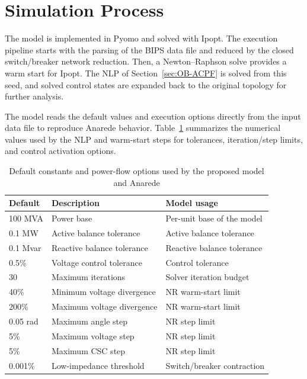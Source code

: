 \documentclass[letterpaper,journal]{IEEEtran}
\begin{document}
\section{Simulation Process}

The model is implemented in Pyomo and solved with Ipopt. The execution pipeline starts with the parsing of the BIPS data file and reduced
by the closed switch/breaker network reduction. Then, a Newton--Raphson solve provides a warm start for Ipopt. The NLP of 
Section~\ref{sec:OB-ACPF} is solved from this seed, and solved control states are expanded back to the original
topology for further analysis.

The model reads the default values and execution options directly from the input data file to reproduce Anarede behavior.
Table~\ref{tab:anarede_defaults} summarizes the numerical values used by the NLP and warm-start steps for tolerances,
iteration/step limits, and control activation options.

\begin{table}[htb]
	\centering
	\footnotesize
	\caption{Default constants and power-flow options used by the proposed model and Anarede}
	\label{tab:anarede_defaults}
	\renewcommand{\arraystretch}{1.2}
	\setlength{\tabcolsep}{2pt}
	\begin{tabular}{lll}
		\hline
		\textbf{Default} & \textbf{Description} & \textbf{Model usage}                  \\ \hline
		100 MVA  & Power base                  & Per-unit base of the model            \\
		0.1 MW   & Active balance tolerance    & Active balance tolerance              \\
		0.1 Mvar & Reactive balance tolerance  & Reactive balance tolerance            \\
		0.5\%    & Voltage control tolerance   & Control tolerance                     \\
		30       & Maximum iterations          & Solver iteration budget               \\
		40\%     & Minimum voltage divergence  & NR warm-start limit                   \\
		200\%    & Maximum voltage divergence  & NR warm-start limit                   \\
		0.05 rad & Maximum angle step          & NR step limit                         \\
		5\%      & Maximum voltage step        & NR step limit                         \\
		5\%      & Maximum CSC step            & NR step limit                         \\
		0.001\%  & Low-impedance threshold     & Switch/breaker contraction            \\ \hline
	\end{tabular}
\end{table}
\end{document}
